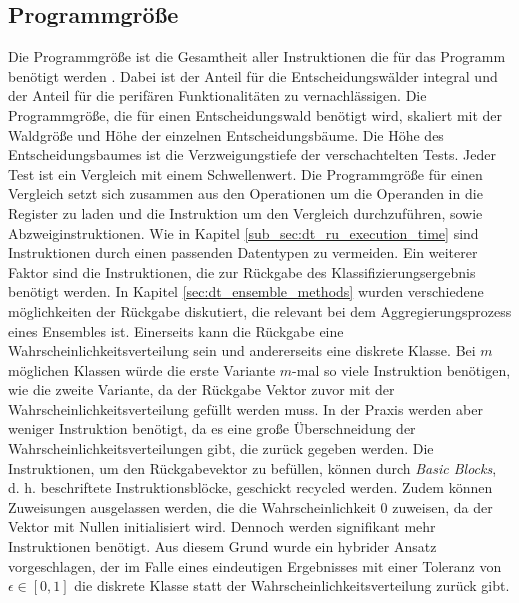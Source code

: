 \subsection{Programmgröße}
\label{sub_sec:dt_ru_programm_size}
Die Programmgröße ist die Gesamtheit aller Instruktionen die für das Programm benötigt werden \cite{dymelThesis}.
Dabei ist der Anteil für die Entscheidungswälder integral und der Anteil für die perifären Funktionalitäten zu vernachlässigen.
Die Programmgröße, die für einen Entscheidungswald benötigt wird, skaliert mit der Waldgröße und Höhe der einzelnen Entscheidungsbäume.
\newline
\newline
Die Höhe des Entscheidungsbaumes ist die Verzweigungstiefe der verschachtelten Tests.
Jeder Test ist ein Vergleich mit einem Schwellenwert.
Die Programmgröße für einen Vergleich setzt sich zusammen aus den Operationen um die Operanden in die Register zu laden
und die Instruktion um den Vergleich durchzuführen, sowie Abzweiginstruktionen. Wie in Kapitel \ref{sub_sec:dt_ru_execution_time}
sind Instruktionen durch einen passenden Datentypen zu vermeiden.
\newline
\newline
Ein weiterer Faktor sind die Instruktionen, die zur Rückgabe des Klassifizierungsergebnis benötigt werden.
In Kapitel \ref{sec:dt_ensemble_methods} wurden verschiedene möglichkeiten der Rückgabe diskutiert, die relevant bei dem Aggregierungsprozess eines Ensembles ist.
Einerseits kann die Rückgabe eine Wahrscheinlichkeitsverteilung sein und andererseits eine diskrete Klasse.
Bei $m$ möglichen Klassen würde die erste Variante $m$-mal so viele Instruktion benötigen, wie die zweite Variante, da der Rückgabe Vektor zuvor mit der Wahrscheinlichkeitsverteilung gefüllt werden muss.
In der Praxis werden aber weniger Instruktion benötigt, da es eine große Überschneidung der Wahrscheinlichkeitsverteilungen gibt, die zurück gegeben werden.
Die Instruktionen, um den Rückgabevektor zu befüllen, können durch \textit{Basic Blocks}, d. h. beschriftete Instruktionsblöcke, geschickt recycled werden.
Zudem können Zuweisungen ausgelassen werden, die die Wahrscheinlichkeit 0 zuweisen, da der Vektor mit Nullen initialisiert wird.
Dennoch werden signifikant mehr Instruktionen benötigt.
Aus diesem Grund wurde ein hybrider Ansatz vorgeschlagen, der im Falle eines eindeutigen Ergebnisses mit einer Toleranz von $\epsilon\in [0, 1]$ die diskrete Klasse statt der Wahrscheinlichkeitsverteilung zurück gibt.